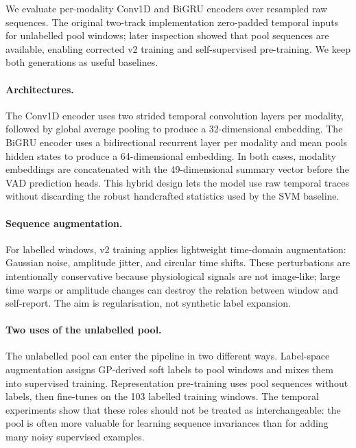 \documentclass[sigconf,review,anonymous]{acmart}
\begin{document}
We evaluate per-modality Conv1D and BiGRU encoders over resampled raw
sequences.
The original two-track implementation zero-padded temporal inputs for
unlabelled pool windows; later inspection showed that pool sequences are
available, enabling corrected v2 training and self-supervised pre-training.
We keep both generations as useful baselines.

\paragraph{Architectures.}
The Conv1D encoder uses two strided temporal convolution layers per modality,
followed by global average pooling to produce a 32-dimensional embedding.
The BiGRU encoder uses a bidirectional recurrent layer per modality and mean
pools hidden states to produce a 64-dimensional embedding.
In both cases, modality embeddings are concatenated with the 49-dimensional
summary vector before the VAD prediction heads.
This hybrid design lets the model use raw temporal traces without discarding
the robust handcrafted statistics used by the SVM baseline.

\paragraph{Sequence augmentation.}
For labelled windows, v2 training applies lightweight time-domain
augmentation: Gaussian noise, amplitude jitter, and circular time shifts.
These perturbations are intentionally conservative because physiological
signals are not image-like; large time warps or amplitude changes can destroy
the relation between window and self-report.
The aim is regularisation, not synthetic label expansion.

\paragraph{Two uses of the unlabelled pool.}
The unlabelled pool can enter the pipeline in two different ways.
Label-space augmentation assigns GP-derived soft labels to pool windows and
mixes them into supervised training.
Representation pre-training uses pool sequences without labels, then fine-tunes
on the 103 labelled training windows.
The temporal experiments show that these roles should not be treated as
interchangeable: the pool is often more valuable for learning sequence
invariances than for adding many noisy supervised examples.
\end{document}
